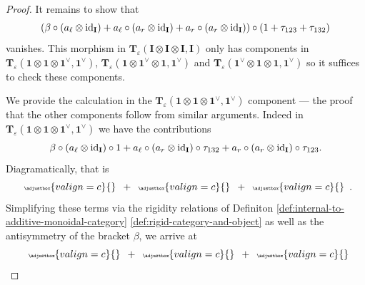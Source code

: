 \begin{proof}
	It remains to show that
	\[(\beta \circ (a_{\ell} \otimes \mathrm{id}_{\mathbf{I}}) + a_{\ell} \circ (a_{r} \otimes \mathrm{id}_{\mathbf{I}}) + a_{r} \circ (a_{r} \otimes \mathrm{id}_{\mathbf{I}})) \circ (1 + \tau_{123} + \tau_{132})\]
	vanishes. This morphism in \(\mathbf{T}_{\varepsilon}(\mathbf{I} \otimes \mathbf{I} \otimes \mathbf{I}, \mathbf{I})\) only has components in \(\mathbf{T}_{\varepsilon}(\mathbf{1} \otimes \mathbf{1} \otimes \mathbf{1}^{\vee}, \mathbf{1}^{\vee})\), \(\mathbf{T}_{\varepsilon}(\mathbf{1} \otimes \mathbf{1}^{\vee} \otimes \mathbf{1}, \mathbf{1}^{\vee})\) and \(\mathbf{T}_{\varepsilon}(\mathbf{1}^{\vee} \otimes \mathbf{1} \otimes \mathbf{1}, \mathbf{1}^{\vee})\) so it suffices to check these components.

	We provide the calculation in the \(\mathbf{T}_{\varepsilon}(\mathbf{1} \otimes \mathbf{1} \otimes \mathbf{1}^{\vee}, \mathbf{1}^{\vee})\) component --- the proof that the other components follow from similar arguments. Indeed in \(\mathbf{T}_{\varepsilon}(\mathbf{1} \otimes \mathbf{1} \otimes \mathbf{1}^{\vee}, \mathbf{1}^{\vee})\) we have the contributions
	\[
		\beta \circ (a_{\ell} \otimes \mathrm{id}_{\mathbf{I}}) \circ 1
		+
		a_{\ell} \circ (a_{r} \otimes \mathrm{id}_{\mathbf{I}}) \circ \tau_{132}
		+
		a_{r} \circ (a_{r} \otimes \mathrm{id}_{\mathbf{I}}) \circ \tau_{123}
		.
	\]
	Diagramatically, that is
	\[
		\mspace{9mu}
		{\tiny
		\def\svgscale{0.30}
		\adjustbox{valign=c}{}
		}
		\mspace{9mu}
		+
		\mspace{9mu}
		{\tiny
		\def\svgscale{0.30}
		\adjustbox{valign=c}{}
		}
		\mspace{9mu}
		+
		\mspace{9mu}
		{\tiny
		\def\svgscale{0.30}
		\adjustbox{valign=c}{}
		}
		\mspace{9mu}
		.
	\]
	Simplifying these terms via the rigidity relations of Definiton \ref{def:internal-to-additive-monoidal-category} \ref{def:rigid-category-and-object} as well as the antisymmetry of the bracket \(\beta\), we arrive at
	\[
		\mspace{9mu}
		{\tiny
		\def\svgscale{0.30}
		\adjustbox{valign=c}{}
		}
		\mspace{9mu}
		+
		\mspace{9mu}
		{\tiny
		\def\svgscale{0.30}
		\adjustbox{valign=c}{}
		}
		\mspace{9mu}
		+
		\mspace{9mu}
		{\tiny
		\def\svgscale{0.30}
		\adjustbox{valign=c}{}
}\]
\end{proof}
